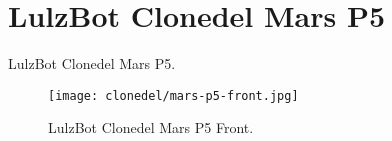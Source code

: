 %
%
%
%
%

\section{LulzBot Clonedel Mars P5}
LulzBot Clonedel Mars P5.

\begin{figure}[h!]
\texttt{[image: clonedel/mars-p5-front.jpg]}
 \caption{LulzBot Clonedel Mars P5 Front.}
 \label{fig:clonedel-mars-p5-front}
\end{figure}


